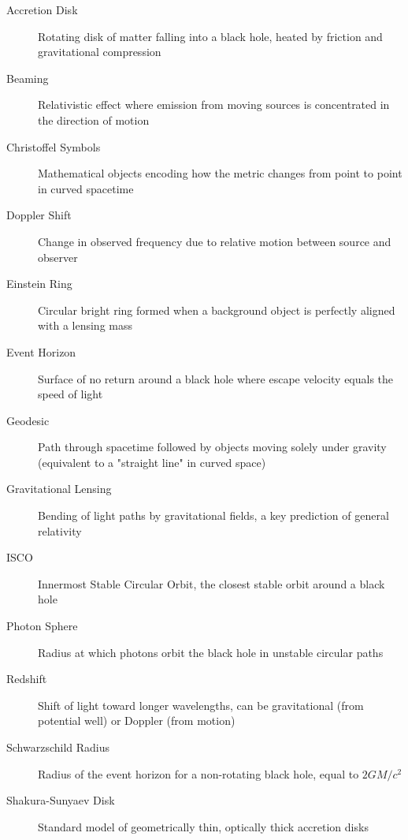 \documentclass[12pt,a4paper]{article}
\theoremstyle{definition}
\theoremstyle{remark}
\begin{document}
\begin{description}
    \item[Accretion Disk] Rotating disk of matter falling into a black hole, heated by friction and gravitational compression
    \item[Beaming] Relativistic effect where emission from moving sources is concentrated in the direction of motion
    \item[Christoffel Symbols] Mathematical objects encoding how the metric changes from point to point in curved spacetime
    \item[Doppler Shift] Change in observed frequency due to relative motion between source and observer
    \item[Einstein Ring] Circular bright ring formed when a background object is perfectly aligned with a lensing mass
    \item[Event Horizon] Surface of no return around a black hole where escape velocity equals the speed of light
    \item[Geodesic] Path through spacetime followed by objects moving solely under gravity (equivalent to a "straight line" in curved space)
    \item[Gravitational Lensing] Bending of light paths by gravitational fields, a key prediction of general relativity
    \item[ISCO] Innermost Stable Circular Orbit, the closest stable orbit around a black hole
    \item[Photon Sphere] Radius at which photons orbit the black hole in unstable circular paths
    \item[Redshift] Shift of light toward longer wavelengths, can be gravitational (from potential well) or Doppler (from motion)
    \item[Schwarzschild Radius] Radius of the event horizon for a non-rotating black hole, equal to $2GM/c^2$
    \item[Shakura-Sunyaev Disk] Standard model of geometrically thin, optically thick accretion disks
\end{description}
\end{document}
